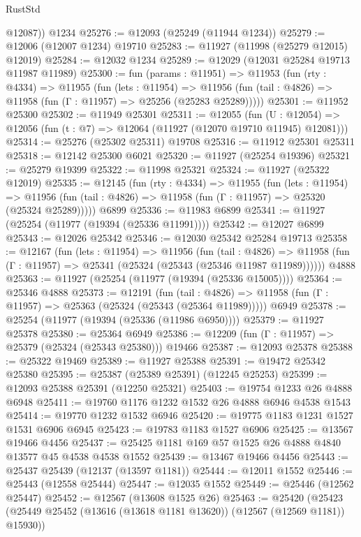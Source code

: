 \begin{lexlean}{RustStd}
\begin{coremodule}
        @12087))
    @1234
@25276 := @12093 (@25249 (@11944 @1234))
@25279 := @12006 (@12007 @1234) @19710
@25283 := @11927 (@11998 (@25279 @12015) @12019)
@25284 := @12032 @1234
@25289 := @12029 (@12031 @25284 @19713 @11987 @11989)
@25300 := fun (params : @11951) =>
  @11953
    (fun (rty : @4334) =>
    @11955
      (fun (lets : @11954) =>
      @11956 (fun (tail : @4826) => @11958 (fun (Γ : @11957) => @25256 (@25283 @25289)))))
@25301 := @11952 @25300
@25302 := @11949 @25301
@25311 := @12055
    (fun (U : @12054) => @12056 (fun (t : @7) => @12064 (@11927 (@12070 @19710 @11945) @12081)))
@25314 := @25276 (@25302 @25311) @19708
@25316 := @11912 @25301 @25311
@25318 := @12142 @25300 @6021
@25320 := @11927 (@25254 @19396)
@25321 := @25279 @19399
@25322 := @11998 @25321
@25324 := @11927 (@25322 @12019)
@25335 := @12145
    (fun (rty : @4334) =>
    @11955
      (fun (lets : @11954) =>
      @11956 (fun (tail : @4826) => @11958 (fun (Γ : @11957) => @25320 (@25324 @25289)))))
    @6899
@25336 := @11983 @6899
@25341 := @11927 (@25254 (@11977 (@19394 (@25336 @11991))))
@25342 := @12027 @6899
@25343 := @12026 @25342
@25346 := @12030 @25342 @25284 @19713
@25358 := @12167
    (fun (lets : @11954) =>
    @11956
      (fun (tail : @4826) =>
      @11958 (fun (Γ : @11957) => @25341 (@25324 (@25343 (@25346 @11987 @11989))))))
    @4888
@25363 := @11927 (@25254 (@11977 (@19394 (@25336 @15005))))
@25364 := @25346 @4888
@25373 := @12191
    (fun (tail : @4826) => @11958 (fun (Γ : @11957) => @25363 (@25324 (@25343 (@25364 @11989)))))
    @6949
@25378 := @25254 (@11977 (@19394 (@25336 (@11986 @6950))))
@25379 := @11927 @25378
@25380 := @25364 @6949
@25386 := @12209 (fun (Γ : @11957) => @25379 (@25324 (@25343 @25380))) @19466
@25387 := @12093 @25378
@25388 := @25322 @19469
@25389 := @11927 @25388
@25391 := @19472 @25342 @25380
@25395 := @25387 (@25389 @25391) (@12245 @25253)
@25399 := @12093 @25388 @25391 (@12250 @25321)
@25403 := @19754 @1233 @26 @4888 @6948
@25411 := @19760 @1176 @1232 @1532 @26 @4888 @6946 @4538 @1543
@25414 := @19770 @1232 @1532 @6946
@25420 := @19775 @1183 @1231 @1527 @1531 @6906 @6945
@25423 := @19783 @1183 @1527 @6906
@25425 := @13567 @19466 @4456
@25437 := @25425 @1181 @169 @57 @1525 @26 @4888 @4840 @13577 @45 @4538 @4538 @1552
@25439 := @13467 @19466 @4456
@25443 := @25437 @25439 (@12137 (@13597 @1181))
@25444 := @12011 @1552
@25446 := @25443 (@12558 @25444)
@25447 := @12035 @1552
@25449 := @25446 (@12562 @25447)
@25452 := @12567 (@13608 @1525 @26)
@25463 := @25420
    (@25423 (@25449 @25452 (@13616 (@13618 @1181 @13620)) (@12567 (@12569 @1181)) @15930))

\end{coremodule}
\end{lexlean}
